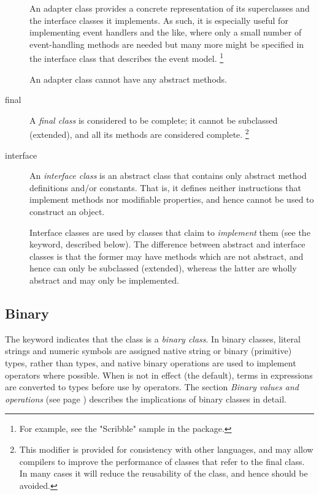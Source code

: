 \begin{description}
An adapter class provides a concrete representation of its superclasses
and the interface classes it implements.  As such, it is especially
useful for implementing event handlers and the like, where only a small
number of event-handling methods are needed but many more might be
specified in the interface class that describes the event model.
\footnote{
For example, see the "Scribble" sample in the \nr{} package.
}
 
An adapter class cannot have any abstract methods.
\item[final]

A \emph{final class} is considered to be complete; it cannot be
subclassed (extended), and all its methods are considered complete.
\footnote{
This modifier is provided for consistency with other languages, and may
allow compilers to improve the performance of classes that refer to the
final class.
In many cases it will reduce the reusability of the class, and hence
should be avoided.
}
\item[interface]\label{refinterf}

An \emph{interface class} is an abstract class that contains only
abstract method definitions and/or constants.  That is, it defines
neither instructions that implement methods nor modifiable properties,
and hence cannot be used to construct an object.
 
Interface classes are used by classes that claim to \emph{implement}
them (see the  keyword, described below).
The difference between abstract and interface classes is that
the former may have methods which are not abstract, and hence can only
be subclassed (extended), whereas the latter are wholly abstract and
may only be implemented.
\end{description}
\subsection{Binary}\label{refbincla}
 
The keyword  indicates that the class is a \emph{binary
class}.
In binary classes, literal strings and numeric symbols are assigned
native string or binary (primitive) types, rather than \nr{} types,
and native binary operations are used to implement operators where
possible.
When  is not in effect (the default), terms in
expressions are converted to \nr{} types before use by operators.
The section  \emph{Binary values and operations} (see page \pageref{refbinary}) 
describes the implications of binary classes in detail.
 
